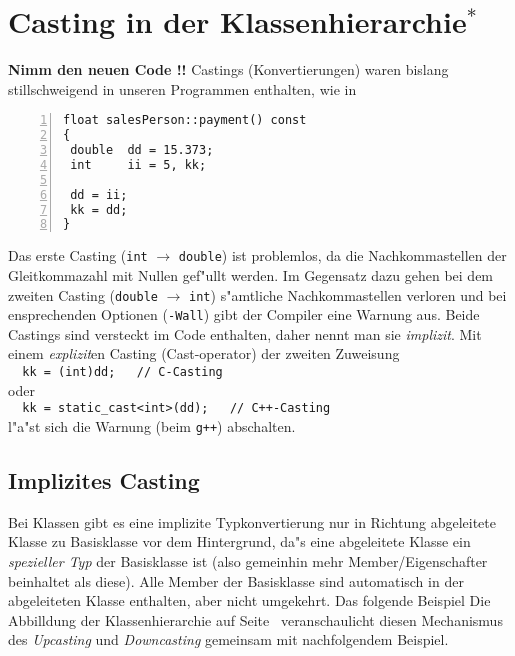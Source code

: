 %
\section{Casting in der Klassenhierarchie$\mbox{}^\ast$}
\label{sec:A4}
{\Large\bf   Nimm den neuen Code !!}
Castings (Konvertierungen) waren bislang stillschweigend in unseren Programmen
enthalten, wie in
\begin{lstlisting}[caption={Implizites Casting bei einfachen Datentypen.},label=lst:casting_implizit_1,
basicstyle=\scriptsize,numbers=left, numberstyle=\tiny, stepnumber=2, numbersep=5pt]
float salesPerson::payment() const
{
 double  dd = 15.373;
 int     ii = 5, kk;

 dd = ii;
 kk = dd;
}
\end{lstlisting}

%
Das erste Casting (\texttt{int} $\longrightarrow$ \texttt{double}) ist
problemlos, da die Nachkommastellen der Gleitkommazahl mit Nullen gef"ullt werden.
Im Gegensatz dazu gehen  bei dem zweiten Casting
(\texttt{double} $\longrightarrow$ \texttt{int})
s"amtliche Nachkommastellen verloren und bei ensprechenden Optionen (\verb|-Wall|)
gibt der Compiler eine Warnung aus. Beide Castings sind versteckt im Code
enthalten, daher nennt man sie \emph{implizit}.
Mit einem \emph{explizit}en Casting
(Cast-operator) der zweiten Zuweisung \\
\verb|  kk = (int)dd;   // C-Casting | \\ oder \\
\verb|  kk = static_cast<int>(dd);   // C++-Casting | \\
l"a"st sich die Warnung (beim \verb|g++|) abschalten.
%
%
\subsection{Implizites Casting}
\label{sec:A4.1}
%
Bei Klassen gibt es eine implizite Typkonvertierung nur in
Richtung abgeleitete Klasse zu Basisklasse vor dem Hintergrund, da"s
eine abgeleitete Klasse ein \emph{spezieller Typ} der Basisklasse ist
(also gemeinhin mehr Member/Eigenschafter beinhaltet als diese).
Alle Member der Basisklasse sind automatisch in der abgeleiteten Klasse enthalten, aber nicht umgekehrt.
Das folgende Beispiel 
Die Abbilldung der Klassenhierarchie auf Seite~\pageref{class_hierarchy} 
veranschaulicht diesen Mechanismus des \emph{Upcasting} und \emph{Downcasting} gemeinsam mit nachfolgendem Beispiel.

